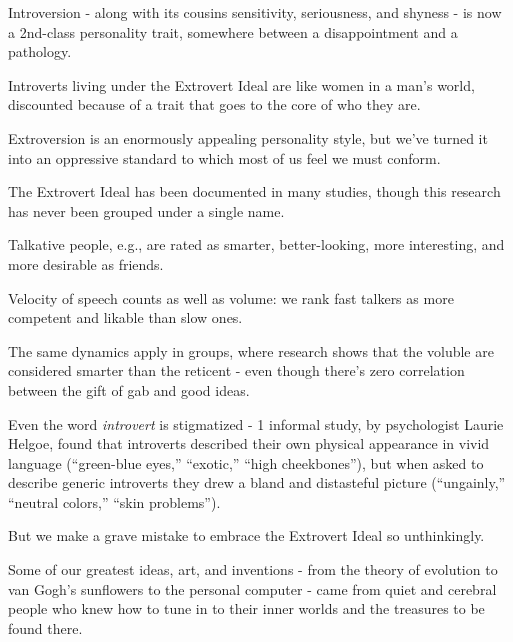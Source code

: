 \documentclass[oneside]{article}
\numberwithin{equation}{section}
\begin{document}
%
Introversion - along with its cousins sensitivity, seriousness, and shyness - is now a 2nd-class personality trait, somewhere between a disappointment and a pathology.

Introverts living under the Extrovert Ideal are like women in a man's world, discounted because of a trait that goes to the core of who they are.

Extroversion is an enormously appealing personality style, but we've turned it into an oppressive standard to which most of us feel we must conform.

%
The Extrovert Ideal has been documented in many studies, though this research has never been grouped under a single name.

Talkative people, e.g., are rated as smarter, better-looking, more interesting, and more desirable as friends.

Velocity of speech counts as well as volume: we rank fast talkers as more competent and likable than slow ones.

The same dynamics apply in groups, where research shows that the voluble are considered smarter than the reticent - even though there's zero correlation between the gift of gab and good ideas.

Even the word \textit{introvert} is stigmatized - 1 informal study, by psychologist Laurie Helgoe, found that introverts described their own physical appearance in vivid language (``green-blue eyes,'' ``exotic,'' ``high cheekbones''), but when asked to describe generic introverts they drew a bland and distasteful picture (``ungainly,'' ``neutral colors,'' ``skin problems'').

%
But we make a grave mistake to embrace the Extrovert Ideal so unthinkingly.

Some of our greatest ideas, art, and inventions - from the theory of evolution to van Gogh's sunflowers to the personal computer - came from quiet and cerebral people who knew how to tune in to their inner worlds and the treasures to be found there.
\end{document}

